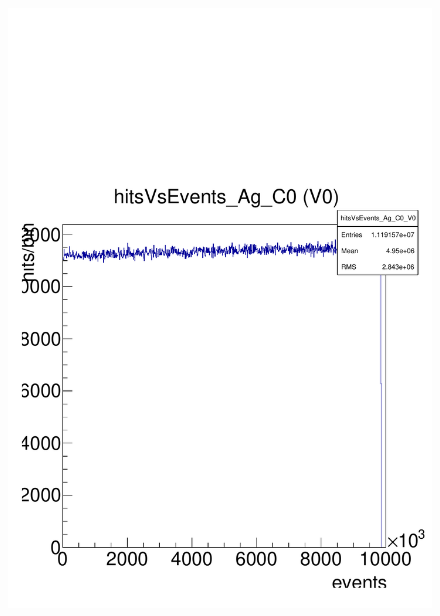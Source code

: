 \documentclass[a4paper,12pt,twoside]{article}
\begin{document}
\begin{figure} [h!]
\begin{minipage}{.48\textwidth}
  \includegraphics[width=\textwidth]{./HRData_HitsEvents.pdf}
  \label{HRData-HitsEvent}
\end{minipage}
\end{figure}
\end{document}
